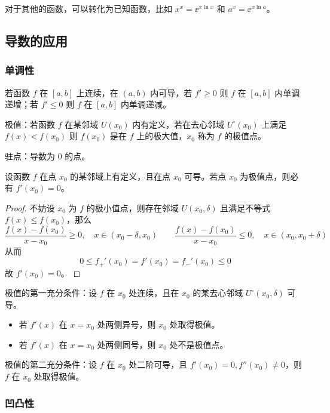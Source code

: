 对于其他的函数，可以转化为已知函数，比如 $x^x = \ee^{x \ln x}$ 和 $a^x = \ee^{x \ln a}$。

\subsection{导数的应用}

\subsubsection*{单调性}

若函数 $f$ 在 $[a, b]$ 上连续，在 $(a, b)$ 内可导，若 $f' \geqslant 0$ 则 $f$ 在 $[a, b]$ 内单调递增；若 $f' \leqslant 0$ 则 $f$ 在 $[a, b]$ 内单调递减。

极值：若函数 $f$ 在某邻域 $U(x_0)$ 内有定义，若在去心邻域 $U^\circ(x_0)$ 上满足 $f(x) < f(x_0)$ 则 $f(x_0)$ 是在 $f$ 上的极大值，$x_0$ 称为 $f$ 的极值点。

驻点：导数为 $0$ 的点。

\begin{theorem}[Fermat 定理]
	设函数 $f$ 在点 $x_0$ 的某邻域上有定义，且在点 $x_0$ 可导。若点 $x_0$ 为极值点，则必有 $f'(x_0)=0$。
\end{theorem}

\begin{proof}
	不妨设 $x_0$ 为 $f$ 的极小值点，则存在邻域 $U(x_0, \delta)$ 且满足不等式 $f(x) \leqslant f(x_0)$，那么
	\[ \frac{f(x) - f(x_0)}{x - x_0} \geqslant 0, \quad x \in (x_0 - \delta, x_0) \qquad
		\frac{f(x) - f(x_0)}{x - x_0} \leqslant 0, \quad x \in (x_0, x_0 + \delta) \]
	从而
	\[ 0 \leqslant f_+'(x_0) = f'(x_0) = f_-'(x_0) \leqslant 0 \]
	故 $f'(x_0) = 0$。
\end{proof}

极值的第一充分条件：设 $f$ 在 $x_0$ 处连续，且在 $x_0$ 的某去心邻域 $U^\circ(x_0, \delta)$ 可导。
\begin{itemize}
	\item 若 $f'(x)$ 在 $x=x_0$ 处两侧异号，则 $x_0$ 处取得极值。
	\item 若 $f'(x)$ 在 $x=x_0$ 处两侧同号，则 $x_0$ 处不是极值点。
\end{itemize}

极值的第二充分条件：设 $f$ 在 $x_0$ 处二阶可导，且 $f'(x_0) = 0, f''(x_0) \neq 0$，则 $f$ 在 $x_0$ 处取得极值。

\subsubsection*{凹凸性}

